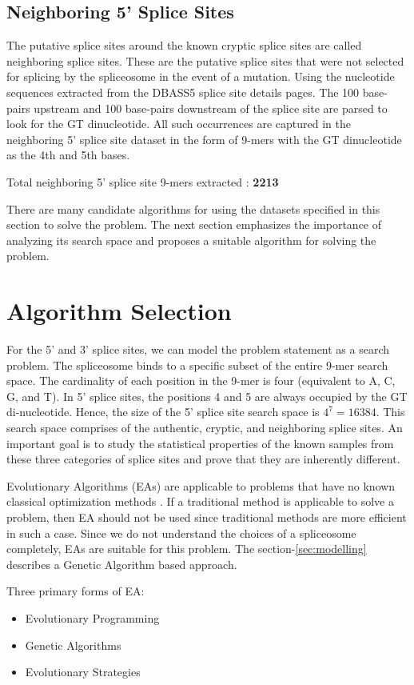 \documentclass[12pt,a4paper]{article}
\begin{document}
	\subsection{Neighboring 5' Splice Sites}
	The putative splice sites around the known cryptic splice sites are called neighboring splice sites. These are the putative splice sites that were not selected for splicing by the spliceosome in the event of a mutation. Using the nucleotide sequences extracted from the DBASS5 splice site details pages. The 100 base-pairs upstream and 100 base-pairs downstream of the splice site are parsed to look for the GT dinucleotide. All such occurrences are captured in the neighboring 5’ splice site dataset in the form of 9-mers with the GT dinucleotide as the 4th and 5th bases.\par
	
	Total neighboring 5’ splice site 9-mers extracted : \textbf{2213} \par
	
	There are many candidate algorithms for using the datasets specified in this section to solve the problem. The next section emphasizes the importance of analyzing its search space and proposes a suitable algorithm for solving the problem.
	
	\section{Algorithm Selection}
	For the 5’ and 3' splice sites, we can model the problem statement as a search problem. The spliceosome binds to a specific subset of the entire 9-mer search space. The cardinality of each position in the 9-mer is four (equivalent to A, C, G, and T). In 5' splice sites, the positions 4 and 5 are always occupied by the GT di-nucleotide. Hence, the size of the 5' splice site search space is $ 4^{7} = 16384 $. This search space comprises of the authentic, cryptic, and neighboring splice sites. An important goal is to study the statistical properties of the known samples from these three categories of splice sites and prove that they are inherently different. \par
	Evolutionary Algorithms (EAs) are applicable to problems that have no known classical optimization methods \cite{handbook}. If a traditional method is applicable to solve a problem, then EA should not be used since traditional methods are more efficient in such a case. Since we do not understand the choices of a spliceosome completely, EAs are suitable for this problem. The section-\ref{sec:modelling} describes a Genetic Algorithm based approach.\par
	Three primary forms of EA:
	\begin{itemize}
	\item Evolutionary Programming
	\item Genetic Algorithms
	\item Evolutionary Strategies
	\end{itemize}
	
\end{document}
